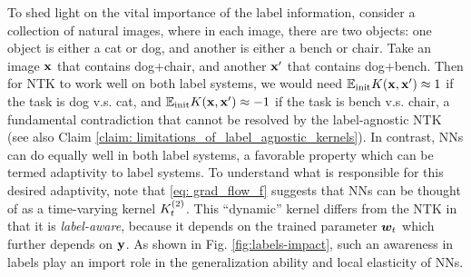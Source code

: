To shed light on the vital importance of the label information, consider a collection of natural images, where in each image, there are two objects: one object is either a cat or dog, and another is either a bench or chair. 
Take an image ${\mathbf{x}}$ that contains dog+chair, and another ${\mathbf{x}}'$ that contains dog+bench. Then for NTK to work well on both label systems, we would need ${\mathbb{E}}_{\textnormal{init}} K({\mathbf{x}}, {\mathbf{x}}')  \approx 1$ if the task is dog v.s. cat, and ${\mathbb{E}}_{\textnormal{init}} K({\mathbf{x}}, {\mathbf{x}}')  \approx -1$ if the task is bench v.s. chair,
a fundamental contradiction that cannot be resolved by the label-agnostic NTK (see also Claim \ref{claim: limitations_of_label_agnostic_kernels}). In contrast, NNs can do equally well in both label systems, a favorable property which can be termed adaptivity to label systems. To understand what is responsible for this desired adaptivity, note that \eqref{eq: grad_flow_f} suggests that NNs can be thought of as a time-varying kernel ${K}^{(2)}_t$. This ``dynamic'' kernel differs from the NTK in that it is \emph{label-aware}, because it depends on the trained parameter ${\boldsymbol{w}}_t$ which further depends on ${\mathbf{y}}$. As shown in Fig. \ref{fig:labels-impact}, such an awareness in labels play an import role in the generalization ability and local elasticity of NNs.



